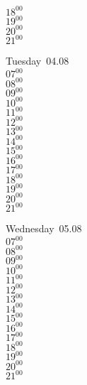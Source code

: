 \documentclass[11pt,a4paper]{book}\usepackage[]{graphicx}\usepackage[]{color}
\begin{document}
{{{{\begin{tcolorbox}
{$18^{00}$\\
$19^{00}$\\
$20^{00}$\\
$21^{00}$}\\
\end{tcolorbox}
%
\begin{tcolorbox}
Tuesday~04.08\\
{ 
$07^{00}$\\
$08^{00}$\\
$09^{00}$\\
$10^{00}$\\
$11^{00}$\\
$12^{00}$\\
$13^{00}$\\
$14^{00}$\\
$15^{00}$\\
$16^{00}$\\
$17^{00}$\\
$18^{00}$\\
$19^{00}$\\
$20^{00}$\\
$21^{00}$}\\
\end{tcolorbox}
%
\begin{tcolorbox}
Wednesday~05.08\\
{ 
$07^{00}$\\
$08^{00}$\\
$09^{00}$\\
$10^{00}$\\
$11^{00}$\\
$12^{00}$\\
$13^{00}$\\
$14^{00}$\\
$15^{00}$\\
$16^{00}$\\
$17^{00}$\\
$18^{00}$\\
$19^{00}$\\
$20^{00}$\\
$21^{00}$}\\
\end{tcolorbox}
\clearpage
%
}}}}
\end{document}
